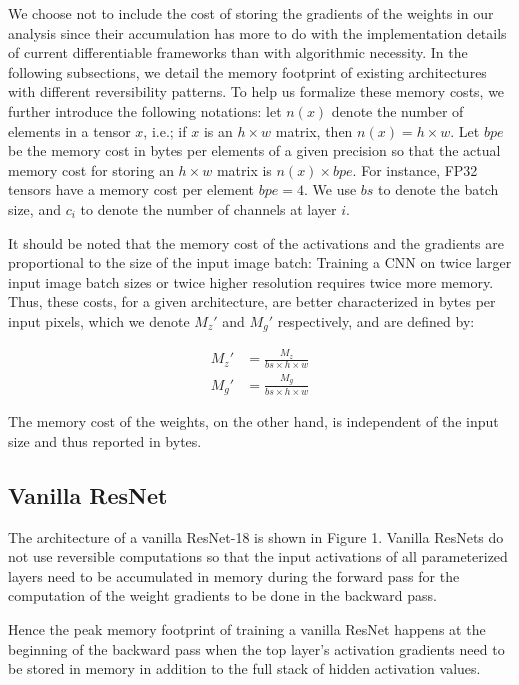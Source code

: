 \documentclass[twocolumn]{bmcart}
\begin{document}
We choose not to include the cost of storing the gradients of the weights in our analysis since their accumulation has more to do with the implementation details of current differentiable frameworks than with algorithmic necessity.
In the following subsections, we detail the memory footprint of existing architectures with different reversibility patterns.
To help us formalize these memory costs, we further introduce the following notations:
let $n(x)$ denote the number of elements in a tensor $x$, i.e.; if $x$ is an $h \times w$ matrix, then $n(x)=h \times w$.
Let $bpe$ be the memory cost in bytes per elements of a given precision so that the actual memory cost for storing an $h \times w$ matrix is $n(x) \times bpe$.
For instance, FP32 tensors have a memory cost per element $bpe=4$.
We use $bs$ to denote the batch size, and $c_i$ to denote the number of channels at layer $i$.

It should be noted that the memory cost of the activations and the gradients are proportional to the size of the input image batch:
Training a CNN on twice larger input image batch sizes or twice higher resolution requires twice more memory.
Thus, these costs, for a given architecture, are better characterized in bytes per input pixels,
which we denote $M_{z}'$ and $M_{g}'$ respectively, and are defined by:

\begin{subequations}
\begin{align}
M_{z}' &= \frac{M_{z}}{bs \times h \times w}  \\
M_{g}' &= \frac{M_{g}}{bs \times h \times w}
\end{align}
\end{subequations}

The memory cost of the weights, on the other hand, is independent of the input size and thus reported in bytes.

\subsection{Vanilla ResNet}

The architecture of a vanilla ResNet-18 is shown in Figure 1.
Vanilla ResNets do not use reversible computations so that the input activations of all parameterized layers need to be accumulated
in memory during the forward pass for the computation of the weight gradients to be done in the backward pass.

Hence the peak memory footprint of training a vanilla ResNet happens at the beginning of the backward pass
when the top layer's activation gradients need to be stored in memory in addition to the full stack of hidden activation values.
\end{document}
